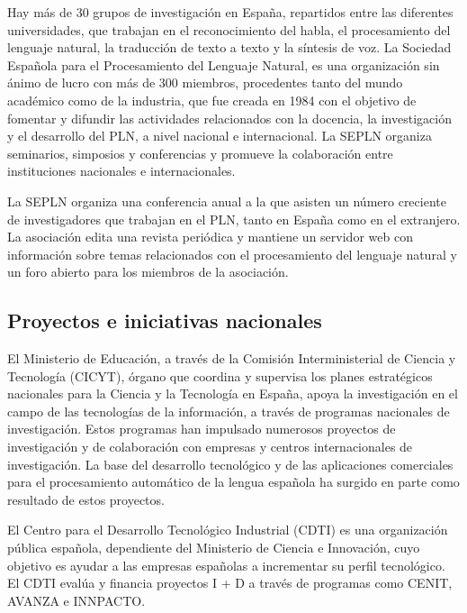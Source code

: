 \begin{multicols}{2}
Hay más de 30 grupos de investigación en España, repartidos entre las diferentes universidades, que trabajan en el reconocimiento del habla, el procesamiento del lenguaje natural, la traducción de texto a texto y la síntesis de voz. La Sociedad Española para el Procesamiento del Lenguaje Natural, es una organización sin ánimo de lucro con más de 300 miembros, procedentes tanto del mundo académico como de la industria, que fue creada en 1984 con el objetivo de fomentar y difundir las actividades relacionados con la docencia, la investigación y el desarrollo del PLN, a nivel nacional e internacional. La SEPLN organiza seminarios, simposios y conferencias y promueve la colaboración entre instituciones nacionales e internacionales.

La SEPLN organiza una conferencia anual a la que asisten un número creciente de investigadores que trabajan en el  PLN, tanto en España como en el extranjero. La asociación edita una revista periódica y mantiene un servidor web con información sobre temas relacionados con el procesamiento del lenguaje natural y un foro abierto para los miembros de la asociación. 

\subsection{Proyectos e iniciativas nacionales}

El Ministerio de Educación, a través de la Comisión Interministerial de Ciencia y Tecnología (CICYT), órgano que coordina y supervisa los planes estratégicos nacionales para la Ciencia y la Tecnología en España, apoya la investigación en el campo de las tecnologías de la información, a través de programas nacionales de investigación. Estos programas han impulsado numerosos proyectos de investigación y de colaboración con empresas y centros internacionales de investigación. La base del desarrollo tecnológico y de las aplicaciones comerciales para el procesamiento automático de la lengua española ha surgido en parte como resultado de estos proyectos.

El Centro para el Desarrollo Tecnológico Industrial (CDTI) es una organización pública española, dependiente del Ministerio de Ciencia e Innovación, cuyo objetivo es ayudar a las empresas españolas a incrementar su perfil tecnológico. El CDTI evalúa y financia proyectos I + D a través de programas como CENIT, AVANZA e INNPACTO.


\end{multicols}

